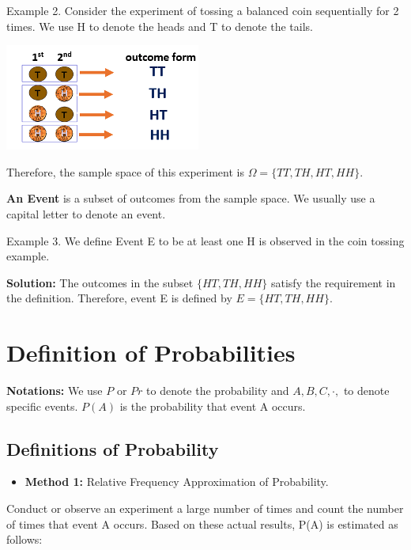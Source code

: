 \documentclass[
]{book}
\providecommand{\tightlist}{%
  \setlength{\itemsep}{0pt}\setlength{\parskip}{0pt}}
\begin{document}
Example 2. Consider the experiment of tossing a balanced coin sequentially for 2 times. We use H to denote the heads and T to denote the tails.

\begin{center}\includegraphics[width=0.4\linewidth]{week03/coinTossing} \end{center}

Therefore, the sample space of this experiment is \(\Omega = \{ TT, TH, HT, HH \}\).

\textbf{An Event} is a subset of outcomes from the sample space. We usually use a capital letter to denote an event.

Example 3. We define Event E to be at least one H is observed in the coin tossing example.

\textbf{Solution: } The outcomes in the subset \(\{HT, TH, HH\}\) satisfy the requirement in the definition. Therefore, event E is defined by \(E = \{ HT, TH, HH\}\).

\hypertarget{definition-of-probabilities}{%
\section{Definition of Probabilities}\label{definition-of-probabilities}}

\textbf{Notations: } We use \(P\) or \(Pr\) to denote the probability and \(A, B, C, \cdot,\) to denote specific events. \(P(A)\) is the probability that event A occurs.

\hypertarget{definitions-of-probability-1}{%
\subsection{Definitions of Probability}\label{definitions-of-probability-1}}

\begin{itemize}
\tightlist
\item
  \textbf{Method 1:} Relative Frequency Approximation of Probability.
\end{itemize}

Conduct or observe an experiment a large number of times and count the number of times that event A occurs. Based on these actual results, P(A) is estimated as follows:
\end{document}
